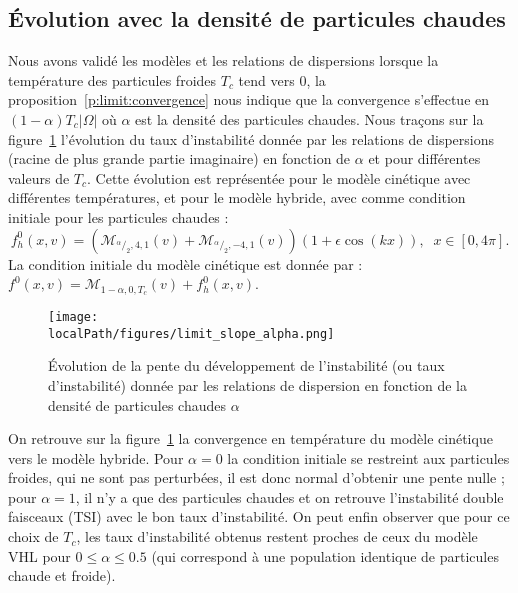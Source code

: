 \FloatBarrier
\subsection{Évolution avec la densité de particules chaudes}

Nous avons validé les modèles et les relations de dispersions lorsque la température des particules froides $T_c$ tend vers $0$, la proposition~\ref{p:limit:convergence} nous indique que la convergence s'effectue en $(1-\alpha)T_c|\Omega|$ où $\alpha$ est la densité des particules chaudes. Nous traçons sur la figure~\ref{fig:limit:slope:alpha} l'évolution du taux d'instabilité donnée par les relations de dispersions (racine de plus grande partie imaginaire) en fonction de $\alpha$ et pour différentes valeurs de $T_c$. Cette évolution est représentée pour le modèle cinétique avec différentes températures, et  pour le modèle hybride, avec comme condition initiale pour les particules chaudes :
$$
  f_h^0(x,v) = \left(\mathcal{M}_{^\alpha/_2,4,1}(v) + \mathcal{M}_{^\alpha/_2,-4,1}(v)\right)(1+\epsilon\cos\left(k x\right)), \;\; x\in [0, 4\pi]. 
$$
La condition initiale du modèle cinétique est donnée par : $f^0(x,v) = \mathcal{M}_{1-\alpha,0,T_c}(v) + f_h^0(x,v)$.
\begin{figure}[h!]
  \centering
  \texttt{[image: \\localPath/figures/limit\_slope\_alpha.png]}
  \caption{Évolution de la pente du développement de l'instabilité (ou taux d'instabilité) donnée par les relations de dispersion en fonction de la densité de particules chaudes $\alpha$}
  \label{fig:limit:slope:alpha}
\end{figure}
On retrouve sur la figure~\ref{fig:limit:slope:alpha} la convergence en température du modèle cinétique vers le modèle hybride. Pour $\alpha=0$ la condition initiale se restreint aux particules froides, qui ne sont pas perturbées, il est donc normal d'obtenir une pente nulle ; pour $\alpha=1$, il n'y a que des particules chaudes et on retrouve l'instabilité double faisceaux (TSI) avec le bon taux d'instabilité. On peut enfin observer que pour ce choix de $T_c$, les taux d'instabilité obtenus restent proches de ceux du modèle VHL pour $0\leq \alpha \leq 0.5$ (qui correspond à une population identique de particules chaude et froide).

\FloatBarrier
